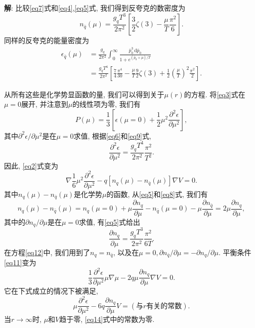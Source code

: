 \documentclass{ctexart}
\newenvironment{answer}{\textbf{解}:}{
\vspace{0.5cm}
}
\newcommand\diff{\,\mathrm{d}}
\begin{document}
\begin{answer}
比较\eqref{eq7}式和\eqref{eq4},\eqref{eq5}式, 我们得到反夸克的数密度为
\begin{equation} \label{eq8}
  n_{\bar{q}}(\mu) = \frac{g_q T^3}{2\pi^2} \left[ \frac{3}{2} \zeta(3) - \frac{\mu}{T} \frac{\pi^2}{6} \right].
\end{equation}
同样的反夸克的能量密度为
\begin{equation}\label{eq9}
  \begin{split}
    \epsilon_{\bar{q}}(\mu) &= \frac{g_q}{2\pi^2} \int_0^\infty \frac{\bar{p}_0^3 \diff \bar{p}_0}{1 + e^{(\bar{p}_0 + \mu)/T}} \\
    &= \frac{g_q T^4}{2\pi^2} \left[ \frac{7}{4} \frac{\pi^4}{30} - \frac{\mu}{T} \frac{9}{2}\zeta(3) + \frac{1}{2} \left( \frac{\mu}{T} \right)^2 \frac{\pi^2}{2}  \right].
  \end{split}
\end{equation}

从所有这些是化学势显函数的量, 我们可以得到关于$\mu(r)$的方程. 将\eqref{eq3}式在$\mu = 0$展开, 并注意到$\mu$的线性项为零, 我们有
\begin{equation}
  P(\mu) = \frac{1}{3} \left[ \epsilon(\mu = 0) + \frac{1}{2}\mu^2 \frac{\partial^2 \epsilon}{\partial \mu^2} \right],
\end{equation}
其中$\partial^2\epsilon/\partial \mu^2$是在$\mu = 0$求值, 根据\eqref{eq6}和\eqref{eq9}式,
\begin{equation}
  \frac{\partial^2 \epsilon}{\partial \mu^2} = \frac{g_qT^4}{2\pi^2} \frac{\pi^2}{T^2}.
\end{equation}
因此, \eqref{eq2}式变为
\begin{equation}\label{eq11}
  \nabla \frac{1}{6} \mu^2 \frac{\partial^2\epsilon}{\partial \mu^2} - q\left[ n_q(\mu) - n_{\bar{q}}(\mu) \right] \nabla V = 0.
\end{equation}
其中$n_q(\mu) - n_{\bar{q}}(\mu)$是化学势$\mu$的函数, 从\eqref{eq5}和\eqref{eq8}式, 我们有
\begin{equation}\label{eq12}
  n_q(\mu)-n_{\bar{q}}(\mu) = n_q(\mu = 0) + \mu \frac{\partial n_q}{\partial \mu} - n_{\bar{q}}(\mu = 0) - \mu \frac{\partial n_{\bar{q}}}{\partial \mu} = 2\mu \frac{\partial n_q}{\partial \mu},
\end{equation}
其中的$\partial n_q / \partial \mu$是在$\mu = 0$求值, 有\eqref{eq5}式给出
\begin{equation}
  \frac{\partial n_q}{\partial \mu} = \frac{g_q T^3}{2\pi^2} \frac{\pi^2}{6T}.
\end{equation}
在方程\eqref{eq12}中, 我们用到了$n_q = n_{\bar{q}}$, 以及在$\mu = 0, \partial n_{\bar{q}} / \partial \mu = - \partial n_q / \partial \mu$. 平衡条件\eqref{eq11}变为
\begin{equation}
  \frac{1}{3} \frac{\partial^2 \epsilon}{\partial \mu^2} \mu \nabla \mu - 2q\mu \frac{\partial n_q}{\partial \mu} \nabla V = 0.
\end{equation}
它在下式成立的情况下被满足,
\begin{equation}\label{eq14}
  \mu \frac{\partial^2\epsilon}{\partial \mu^2} - 6q \frac{\partial n_q}{\partial \mu} V = (\text{与}r\text{有关的常数}).
\end{equation}
当$r \rightarrow \infty$时, $\mu$和$V$趋于零, \eqref{eq14}式中的常数为零.


\end{answer}
\end{document}
